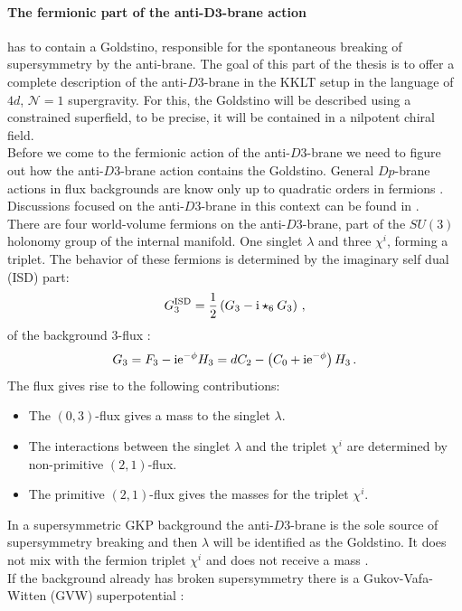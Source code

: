 \documentclass[a4paper,12pt,twoside,openright]{report}
\newcommand{\be}{\begin{equation}}
\newcommand{\ee}{\end{equation}}
\def\rmi{{\rm i}}
\def\rme{{\rm e}}
\begin{document}
\paragraph{The fermionic part of the anti-$\mathbf{D3}$-brane action} has to contain a Goldstino, responsible for the spontaneous breaking of supersymmetry by the anti-brane. The goal of this part of the thesis is  to offer a complete description of the anti-$D3$-brane in the KKLT setup in the language of $4d$, $\mathcal{N}=1$ supergravity. For this, the Goldstino will be described using a constrained superfield, to be precise, it will be contained in a nilpotent chiral field. \\
Before we come to the fermionic action of the anti-$D3$-brane we need to figure out how the anti-$D3$-brane action contains the Goldstino. General $Dp$-brane actions in flux backgrounds are know only up to quadratic orders in fermions \cite{Grana:2002tu,Grana:2003ek,Marolf:2003ye,Tripathy:2005hv,Martucci:2005rb,Bergshoeff:2013pia}. Discussions focused on the anti-$D3$-brane in this context can be found in \cite{Kallosh:2014wsa,Bergshoeff:2015jxa,GarciadelMoral:2017vnz,McGuirk:2012sb}. \\
There are four world-volume fermions on the anti-$D3$-brane, part of the $SU(3)$ holonomy group of the internal manifold. One singlet $\lambda$ and three $\chi^i$, forming a triplet. The behavior of these fermions is determined by the imaginary  self dual (ISD) part:
\be 
G_3^{\text{ISD}} = \frac{1}{2} \left( G_3 - \rmi \star_6 G_3 \right)\,,
\ee
of the background 3-flux \cite{Bergshoeff:2015jxa,McGuirk:2012sb}:
\be 
G_3 = F_3 - \rmi \rme^{-\phi} H_3 = dC_2 - \left(C_0 + \rmi \rme^{-\phi} \right) H_3\,.
\ee
The flux gives rise to the following contributions:
\begin{itemize}
\item The $(0,3)$-flux gives a mass to the singlet $\lambda$.
\item The interactions between the singlet $\lambda$ and the triplet $\chi^i$ are determined by non-primitive $(2,1)$-flux.
\item The primitive $(2,1)$-flux gives the masses for the triplet $\chi^i$.
\end{itemize}
In a supersymmetric GKP background the anti-$D3$-brane is the sole source of supersymmetry breaking and then $\lambda$ will be identified as the Goldstino. It does not mix with the fermion triplet $\chi^i$ and does not receive a mass \cite{Bergshoeff:2015jxa}.\\
If the background already has broken supersymmetry there is a Gukov-Vafa-Witten (GVW) superpotential \cite{Gukov:1999ya}:
\end{document}
